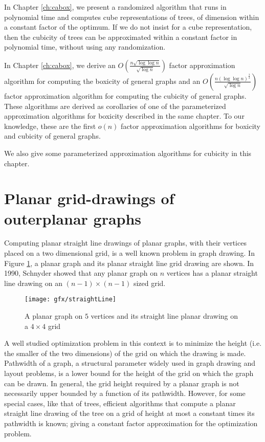 In Chapter \ref{ch:cabox}, we present a randomized algorithm that runs in polynomial time and computes cube representations of trees, 
of dimension within a constant factor of the optimum.  If we do not insist for a cube representation, then the cubicity of trees can be approximated 
within a constant factor in polynomial time, without using any randomization. 

In Chapter \ref{ch:cabox}, we derive an $O\left(\frac{n\sqrt{\log \log n}}{\sqrt{\log n}}\right)$
factor approximation algorithm for computing the boxicity of general graphs and an 
$O\left(\frac{n {(\log \log n)}^{\frac{3}{2}}}{\sqrt{\log n}}\right)$ factor approximation algorithm for computing the cubicity of general graphs. 
These algorithms are derived as corollaries of one of the parameterized approximation algorithms for boxicity 
described in the same chapter. To our knowledge, these are the first $o(n)$ factor approximation algorithms for boxicity and cubicity of general graphs.

We also give some parameterized approximation algorithms for cubicity in this chapter.
\section{Planar grid-drawings of outerplanar graphs}\label{introOuterplanar}
Computing planar straight line drawings of planar graphs, with their vertices placed on a two dimensional grid, is a well known problem in graph drawing. 
In Figure \ref{FigstraightLine}, a planar graph and its planar straight line grid drawing are shown. 
In 1990, Schnyder \cite{Schnyder1990} showed that any planar graph on $n$ vertices has a planar straight line drawing on an $(n-1) \times (n-1)$ sized grid. 

\begin{figure}[h]
\begin{center}
\texttt{[image: gfx/straightLine]}
\caption{A planar graph on $5$ vertices and its straight line planar drawing on a $4 \times 4$ grid}
\label{FigstraightLine}
\end{center}
\end{figure}

A well studied optimization problem in this context is to minimize the height (i.e. the smaller of the two dimensions) of the grid on which the drawing is made. 
Pathwidth of a graph, a structural parameter widely used in graph drawing and layout problems, is a lower bound for the height of the grid on which the graph can be drawn. 
In general, the grid height required by a planar graph is not necessarily upper bounded by a function of its pathwidth. 
However, for some special cases, like that of trees, efficient algorithms that compute a planar straight line drawing of the tree on a grid of height at most
a constant times its pathwidth is known; giving a constant factor approximation for the optimization problem. 

